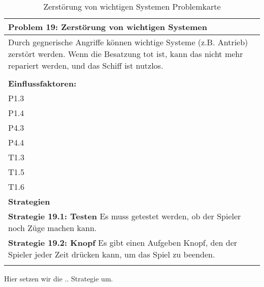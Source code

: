 \documentclass[fontsize=12pt,paper=a4,twoside]{scrartcl}
\begin{document}
\begin{table}[H]
    \centering
    \begin{tabular}{|p{15cm}|}
    \hline
          \textbf{Problem 19: Zerstörung von wichtigen Systemen}  \\ \hline
	Durch gegnerische Angriffe können wichtige Systeme (z.B. Antrieb) zerstört werden. Wenn die Besatzung tot ist, kann das nicht mehr repariert werden, und das Schiff ist nutzlos. \\
         \\ \hline
          \textbf{Einflussfaktoren: } \\
	P1.3 \\
	P1.4 \\
	P4.3 \\
	P4.4 \\
	T1.3 \\
	T1.5 \\
	T1.6 \\
          \hline
          \textbf{Strategien} \\ \hline
            {}          
           \label{strategie:19.1}     
          \textbf{Strategie 19.1: Testen} Es muss getestet werden, ob der Spieler noch Züge machen kann.  \\        
  {}          
           \label{strategie:19.2}              
          \textbf{Strategie 19.2: Knopf} Es gibt einen Aufgeben Knopf, den der Spieler jeder Zeit drücken kann, um das Spiel zu beenden.  \\
	 \\ \hline
    \end{tabular}

    \caption{Zerstörung von wichtigen Systemen Problemkarte}
    \label{tab:ProblemKarte19}
\end{table}
Hier setzen wir die .. Strategie um. \\
\end{document}
